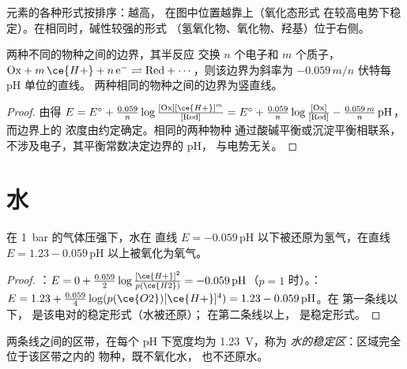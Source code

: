 元素的各种形式按排序：越高，
在图中位置越靠上（氧化态形式
在较高电势下稳定）。在相同时，碱性较强的形式
（氢氧化物、氧化物、羟基）位于右侧。

\begin{proposition}[边界的斜率]\label{prop:b1:e-ph-diagrams:boundary-slope}
两种不同的物种之间的边界，其半反应
交换 $n$ 个电子和 $m$ 个质子，
$\mathrm{Ox} + m\,\ce{H+} + n\,\mathrm{e^-} \rightleftharpoons \mathrm{Red} +
\cdots$，则该边界为斜率为 $-0.059\,m/n$ 伏特每 pH 单位的直线。
两种相同的物种之间的边界为竖直线。
\end{proposition}

\begin{proof}
由得 $E = E^\circ + \frac{0.059}{n}\log\frac{[\mathrm{Ox}]
[\ce{H+}]^m}{[\mathrm{Red}]} = E^\circ + \frac{0.059}{n}\log\frac{[\mathrm{Ox}]}
{[\mathrm{Red}]} - \frac{0.059\,m}{n}\,\mathrm{pH}$，而边界上的
浓度由约定确定。相同的两种物种
通过酸碱平衡或沉淀平衡相联系，
不涉及电子，其平衡常数决定边界的 pH，
与电势无关。
\end{proof}

\section{水}

\begin{proposition}[水的两条线]\label{prop:b1:e-ph-diagrams:water-lines}
在 \qty{1}{bar} 的气体压强下，水在
直线 $E = -0.059\,\mathrm{pH}$ 以下被还原为氢气，在直线 $E = 1.23
- 0.059\,\mathrm{pH}$ 以上被氧化为氧气。
\end{proposition}

\begin{proof}
：$E = 0 + \frac{0.059}{2}\log\frac{[\ce{H+}]^2}{p(\ce{H2})}
= -0.059\,\mathrm{pH}$（$p = 1$ 时）。：$E = 1.23 +
\frac{0.059}{4}\log(p(\ce{O2})[\ce{H+}]^4) = 1.23 - 0.059\,\mathrm{pH}$。在
第一条线以下， 是该电对的稳定形式（水被还原）；
在第二条线以上， 是稳定形式。
\end{proof}

\begin{definition}[水的稳定区]\label{def:b1:e-ph-diagrams:water-domain}
两条线之间的区带，在每个 pH 下宽度均为 \qty{1.23}{V}，称为
\emph{水的稳定区}：区域完全位于该区带之内的
物种，既不氧化水，
也不还原水。
\end{definition}


